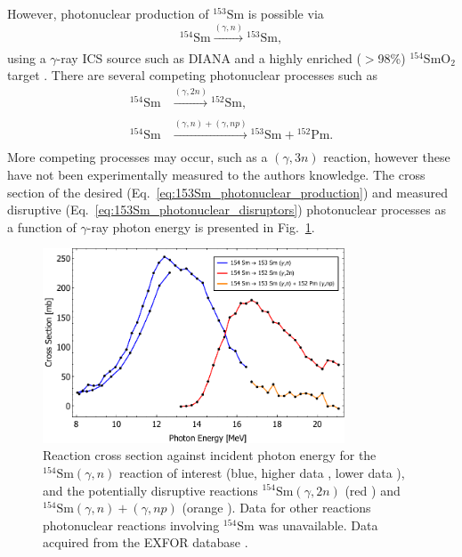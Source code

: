 \documentclass[../main.tex]{subfiles}
\begin{document}
However, photonuclear production of $^{153}\mathrm{Sm}$ \cite{carlos1974giant,filipescu2014photoneutron} is possible via
\begin{equation}
^{154}\mathrm{Sm}\xrightarrow[]{\left(\gamma,n\right)}{}^{153}\mathrm{Sm},
\label{eq:153Sm_photonuclear_production}    
\end{equation}
using a $\gamma$-ray ICS source such as DIANA and a highly enriched ($>$98\%) $^{154}\mathrm{SmO}_{2}$ target \cite{bell1987stable,isoflex2021sm}. There are several competing photonuclear processes such as \cite{carlos1974giant}
\begin{align}
^{154}\mathrm{Sm}&\xrightarrow[]{\left(\gamma,2n\right)}{}^{152}\mathrm{Sm},\\
^{154}\mathrm{Sm}&\xrightarrow[]{\left(\gamma,n\right)+\left(\gamma,np\right)}{}^{153}\mathrm{Sm}+{}^{152}\mathrm{Pm}.
\label{eq:153Sm_photonuclear_disruptors}    
\end{align}
More competing processes may occur, such as a $\left(\gamma,3n\right)$ reaction, however these have not been experimentally measured to the authors knowledge. The cross section of the desired (Eq.~\ref{eq:153Sm_photonuclear_production}) and measured disruptive (Eq.~\ref{eq:153Sm_photonuclear_disruptors}) photonuclear processes as a function of $\gamma$-ray photon energy is presented in Fig.~\ref{fig:154Sm_cross_section_photon_energy}.
\begin{figure}[!h]
\centering
\includegraphics[width=0.8\textwidth]{Figures/DIANA_Inverse_Compton_Source_Design/Sm154Landscape.pdf}
\caption{Reaction cross section against incident photon energy for the $^{154}\mathrm{Sm} \left(\gamma,n\right)$ reaction of interest (blue, higher data \cite{carlos1974giant}, lower data \cite{filipescu2014photoneutron}), and the potentially disruptive reactions $^{154}\mathrm{Sm} \left(\gamma,2n\right)$ (red \cite{carlos1974giant}) and $^{154}\mathrm{Sm} \left(\gamma,n\right) + \left(\gamma,np\right)$ (orange \cite{carlos1974giant}). Data for other reactions photonuclear reactions involving $^{154}\mathrm{Sm}$ was unavailable. Data acquired from the EXFOR database \cite{zerkin2018experimental}. }
\label{fig:154Sm_cross_section_photon_energy}
\end{figure}
\end{document}

